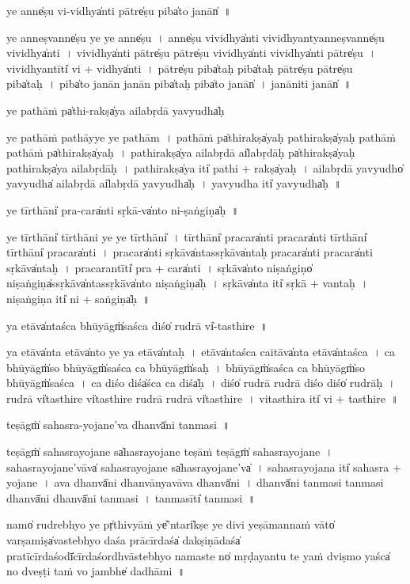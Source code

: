 \documentclass[parskip, DIV=14]{scrartcl}
\begin{document}
{ye anne̍ṣu vi॒-vidhya̍nti॒ pātre̍ṣu॒ piba̍to॒ janān̍~॥

ye anne॒ṣvanne̍ṣu॒ ye ye anne̍ṣu~।
anne̍ṣu vi॒vidhya̍nti vi॒vidhya॒ntyanne॒ṣvanne̍ṣu vi॒vidhya̍nti~।
vi॒vidhya̍nti॒ pātre̍ṣu॒ pātre̍ṣu vi॒vidhya̍nti vi॒vidhya̍nti॒ pātre̍ṣu~।
vi॒vidhya॒ntīti̍ vi + vidhya̍nti~।
pātre̍ṣu॒ piba̍ta॒ḥ piba̍ta॒ḥ pātre̍ṣu॒ pātre̍ṣu॒ piba̍taḥ~।
piba̍to॒ janā॒n janā॒n piba̍ta॒ḥ piba̍to॒ janān̍~।
janā॒niti॒ janān̍~॥

ye pa॒thāṁ pa̍thi॒-rakṣa̍ya ailabṛ॒dā yavyudha̍ḥ

ye pa॒thāṁ pa॒thāyye ye pa॒thām~।
pa॒thāṁ pa̍thi॒rakṣa̍yaḥ pathi॒rakṣa̍yaḥ pa॒thāṁ pa॒thāṁ pa̍thi॒rakṣa̍yaḥ~।
pa॒thi॒rakṣa̍ya ailabṛ॒dā ai̍labṛ॒dāḥ pa̍thi॒rakṣa̍yaḥ pathi॒rakṣa̍ya ailabṛ॒dāḥ~।
pa॒thi॒rakṣa̍ya॒ iti̍ pathi + rakṣa̍yaḥ~।
ai॒la॒bṛ॒dā ya॒vyudho̍ ya॒vyudha̍ ailabṛ॒dā ai̍labṛ॒dā ya॒vyudha̍ḥ~।
ya॒vyudha॒ iti̍ ya॒vyudha̍ḥ~॥

ye tī॒rthāni̍ pra॒-cara̍nti sṛ॒kā-va̍nto ni-ṣa॒ṅgiṇa̍ḥ~॥

ye tī॒rthāni̍ tī॒rthāni॒ ye ye tī॒rthāni̍~।
tī॒rthāni̍ pra॒cara̍nti pra॒cara̍nti tī॒rthāni̍ tī॒rthāni̍ pra॒cara̍nti~।
pra॒cara̍nti sṛ॒kāva̍ntassṛ॒kāva̍ntaḥ pra॒cara̍nti pra॒cara̍nti sṛ॒kāva̍ntaḥ~।
pra॒cara॒ntīti̍ pra + cara̍nti~।
sṛ॒kāva̍nto niṣa॒ṅgiṇo̍ niṣa॒ṅgiṇa̍ssṛ॒kāva̍ntassṛ॒kāva̍nto niṣa॒ṅgiṇa̍ḥ~।
sṛ॒kāva̍nta॒ iti̍ sṛ॒kā + va॒nta॒ḥ॒~।
ni॒ṣa॒ṅgiṇa॒ iti̍ ni + sa॒ṅgiṇa̍ḥ~॥

ya e॒tāva̍ntaśca॒ bhūyāgṁ̍saśca॒ diśo̍ ru॒drā vi̍-tasthi॒re~॥

ya e॒tāva̍nta e॒tāva̍nto॒ ye ya e॒tāva̍ntaḥ~।
e॒tāva̍ntaśca cai॒tāva̍nta e॒tāva̍ntaśca~।
ca॒ bhūyāgṁ̍so॒ bhūyāgṁ̍saśca ca॒ bhūyāgṁ̍saḥ~।
bhūyāgṁ̍saśca ca॒ bhūyāgṁ̍so॒ bhūyāgṁ̍saśca~।
ca॒ diśo॒ diśa̍śca ca॒ diśa̍ḥ~।
diśo̍ ru॒drā ru॒drā diśo॒ diśo̍ ru॒drāḥ~।
ru॒drā vi̍tasthi॒re vi̍tasthi॒re ru॒drā ru॒drā vi̍tasthi॒re~।
vi॒ta॒sthi॒ra iti̍ vi + ta॒sthi॒re~॥

teṣāgṁ̍ sahasra-yoja॒ne'va॒ dhanvā̍ni tanmasi~॥

teṣāgṁ̍ sahasrayoja॒ne sa̍hasrayoja॒ne teṣā॒ṁ teṣāgṁ̍ sahasrayoja॒ne~।
sa॒ha॒sra॒yo॒ja॒ne'vāva̍ sahasrayoja॒ne sa̍hasrayoja॒ne'va̍~।
sa॒ha॒sra॒yo॒ja॒na iti̍ sahasra + yo॒ja॒ne~।
ava॒ dhanvā̍ni॒ dhanvā॒nyavāva॒ dhanvā̍ni~।
dhanvā̍ni tanmasi tanmasi॒ dhanvā̍ni॒ dhanvā̍ni tanmasi~।
ta॒nma॒sīti̍ tanmasi~॥

namo̍ ru॒drebhyo॒ ye pṛ̍thi॒vyāṁ ye̎'ntari̍kṣe॒ ye di॒vi yeṣā॒manna॒ṁ vāto̍ va॒rṣamiṣa̍va॒stebhyo॒ daśa॒ prācī॒rdaśa̍ dakṣi॒ṇādaśa̍ pra॒tīcī॒rdaśodī̍cī॒rdaśo॒rdhvāstebhyo॒ nama॒ste no̍ mṛḍayantu॒ te yaṁ dvi॒ṣmo yaśca̍ no॒ dveṣṭi॒ taṁ vo॒ jambhe̍ dadhāmi~॥

}
\end{document}
